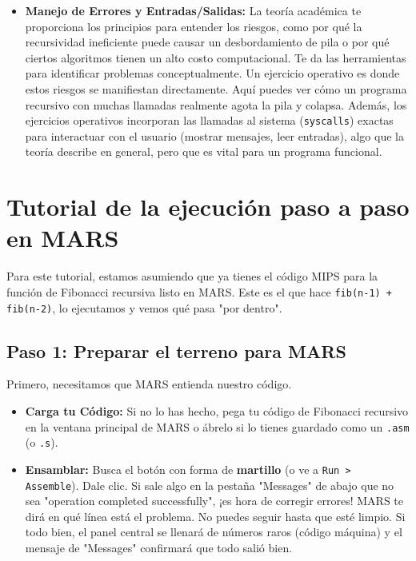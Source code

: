 \documentclass{article}
\begin{document}
\begin{itemize}
    \item \textbf{Manejo de Errores y Entradas/Salidas:} La teoría académica te proporciona los principios para entender los riesgos, como por qué la recursividad ineficiente puede causar un desbordamiento de pila o por qué ciertos algoritmos tienen un alto costo computacional. Te da las herramientas para identificar problemas conceptualmente. Un ejercicio operativo es donde estos riesgos se manifiestan directamente. Aquí puedes ver cómo un programa recursivo con muchas llamadas realmente agota la pila y colapsa. Además, los ejercicios operativos incorporan las llamadas al sistema (\texttt{syscalls}) exactas para interactuar con el usuario (mostrar mensajes, leer entradas), algo que la teoría describe en general, pero que es vital para un programa funcional.
\end{itemize}

\section*{Tutorial de la ejecución paso a paso en MARS}

Para este tutorial, estamos asumiendo que ya tienes el código MIPS para la función de Fibonacci recursiva listo en MARS. Este es el que hace \texttt{fib(n-1) + fib(n-2)}, lo ejecutamos y vemos qué pasa "por dentro".

\subsection*{Paso 1: Preparar el terreno para MARS}
Primero, necesitamos que MARS entienda nuestro código.
\begin{itemize}
    \item \textbf{Carga tu Código:} Si no lo has hecho, pega tu código de Fibonacci recursivo en la ventana principal de MARS o ábrelo si lo tienes guardado como un \texttt{.asm} (o \texttt{.s}).
    \item \textbf{Ensamblar:} Busca el botón con forma de \textbf{martillo} (o ve a \texttt{Run > Assemble}). Dale clic. Si sale algo en la pestaña "Messages" de abajo que no sea "operation completed successfully", ¡es hora de corregir errores! MARS te dirá en qué línea está el problema. No puedes seguir hasta que esté limpio. Si todo bien, el panel central se llenará de números raros (código máquina) y el mensaje de "Messages" confirmará que todo salió bien.
\end{itemize}
\end{document}
